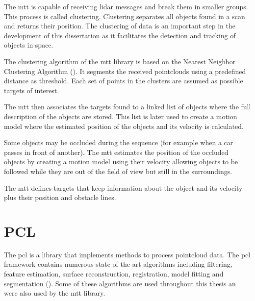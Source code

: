 The \gls{mtt} is capable of receiving \gls{lidar} messages and break them in smaller groups. This process is called clustering. Clustering separates all objects found in a scan and returns their position. The clustering of data is an important step in the development of this dissertation as it facilitates the detection and tracking of objects in space. 

The clustering algorithm of the \gls{mtt} library is based on the Nearest Neighbor Clustering Algorithm (\cite{Luo}). It segments the received pointclouds using a predefined distance as threshold. Each set of points in the clusters are assumed as possible targets of interest.

The \gls{mtt} then associates the targets found to a linked list of objects where the full description of the objects are stored. This list is later used to create a motion model where the estimated position of the objects and its velocity is calculated. 

Some objects may be occluded during the sequence (for example when a car passes in front of another). The \gls{mtt} estimates the position of the occluded objects by creating a motion model using their velocity allowing objects to be followed while they are out of the field of view but still in the surroundings.

The \gls{mtt} defines targets that keep information about the object and its velocity plus their position and obstacle lines.

\section{PCL}

The \gls{pcl} is a library that implements methods to process pointcloud data. The \gls{pcl} framework contains numerous state of the art algorithms including filtering, feature estimation, surface reconstruction, registration, model fitting and segmentation (\cite{PointCloudLibrary2018}). Some of these algorithms are used throughout this thesis an were also used by the \gls{mtt} library.



 








